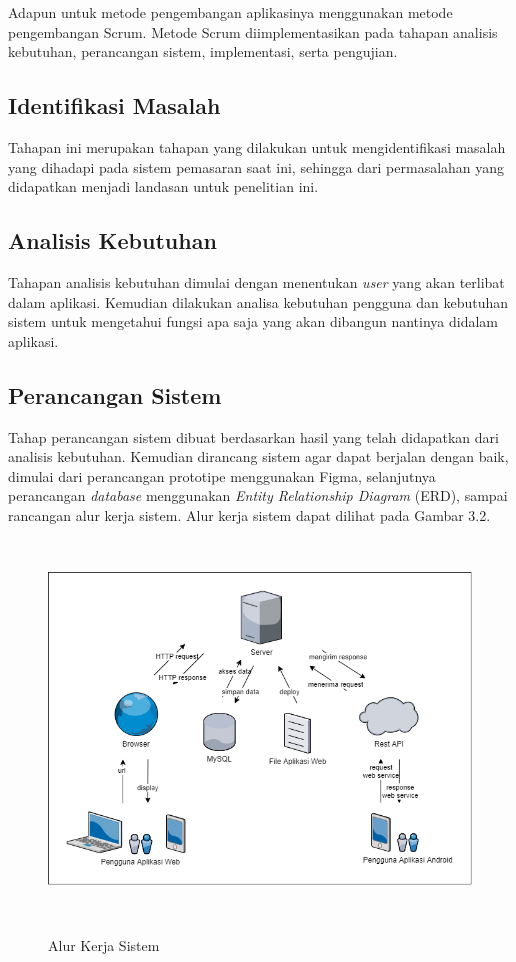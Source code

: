 \par Adapun untuk metode pengembangan aplikasinya menggunakan metode pengembangan Scrum. Metode Scrum diimplementasikan pada tahapan analisis kebutuhan, perancangan sistem, implementasi, serta pengujian.

\fancyhf{} 
\fancyfoot[R]{\thepage}

\subsection{Identifikasi Masalah}
Tahapan ini merupakan tahapan yang dilakukan untuk mengidentifikasi masalah yang dihadapi pada sistem pemasaran saat ini, sehingga dari permasalahan yang didapatkan menjadi landasan untuk penelitian ini.

\subsection{Analisis Kebutuhan}
Tahapan analisis kebutuhan dimulai dengan menentukan \textit{user} yang akan terlibat dalam aplikasi. Kemudian dilakukan analisa kebutuhan pengguna dan kebutuhan sistem untuk mengetahui fungsi apa saja yang akan dibangun nantinya didalam aplikasi.

\subsection{Perancangan Sistem}
Tahap perancangan sistem dibuat berdasarkan hasil yang telah didapatkan dari analisis kebutuhan. Kemudian dirancang sistem agar dapat berjalan dengan baik, dimulai dari perancangan prototipe menggunakan Figma, selanjutnya perancangan \textit{database} menggunakan \textit{Entity Relationship Diagram} (ERD), sampai rancangan alur kerja sistem. Alur kerja sistem dapat dilihat pada Gambar 3.2.

\begin{figure}[H]
\centering
{\includegraphics [width = 14cm, height= 10cm]{gambar/alur_kerja_sistem}}
\caption{Alur Kerja Sistem}
\label{alur_kerja_sistem}
\end{figure}


